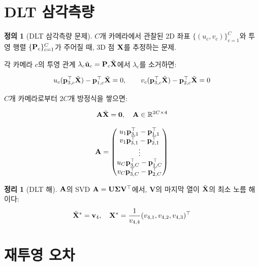 \documentclass[11pt, a4paper]{report}
\theoremstyle{definition}
\newtheorem{definition}{정의}[chapter]
\newtheorem{theorem}{정리}[chapter]
\theoremstyle{remark}
\begin{document}
\section{DLT 삼각측량}

\begin{definition}[DLT 삼각측량 문제]
$C$개 카메라에서 관찰된 2D 좌표 $\{(u_c, v_c)\}_{c=1}^{C}$와
투영 행렬 $\{\mathbf{P}_c\}_{c=1}^{C}$가 주어질 때,
3D 점 $\mathbf{X}$를 추정하는 문제.
\end{definition}

각 카메라 $c$의 투영 관계 $\lambda_c \tilde{\mathbf{u}}_c = \mathbf{P}_c \tilde{\mathbf{X}}$에서
$\lambda_c$를 소거하면:

\begin{equation}
u_c (\mathbf{p}_{3,c}^\top \tilde{\mathbf{X}}) - \mathbf{p}_{1,c}^\top \tilde{\mathbf{X}} = 0, \qquad
v_c (\mathbf{p}_{3,c}^\top \tilde{\mathbf{X}}) - \mathbf{p}_{2,c}^\top \tilde{\mathbf{X}} = 0
\end{equation}

$C$개 카메라로부터 $2C$개 방정식을 쌓으면:

\begin{equation}
\mathbf{A} \tilde{\mathbf{X}} = \mathbf{0}, \quad
\mathbf{A} \in \mathbb{R}^{2C \times 4}
\label{eq:dlt}
\end{equation}

\begin{equation}
\mathbf{A} = \begin{pmatrix}
u_1 \mathbf{p}_{3,1}^\top - \mathbf{p}_{1,1}^\top \\
v_1 \mathbf{p}_{3,1}^\top - \mathbf{p}_{2,1}^\top \\
\vdots \\
u_C \mathbf{p}_{3,C}^\top - \mathbf{p}_{1,C}^\top \\
v_C \mathbf{p}_{3,C}^\top - \mathbf{p}_{2,C}^\top
\end{pmatrix}
\end{equation}

\begin{theorem}[DLT 해]
$\mathbf{A}$의 SVD $\mathbf{A} = \mathbf{U} \bm{\Sigma} \mathbf{V}^\top$에서,
$\mathbf{V}$의 마지막 열이 $\tilde{\mathbf{X}}$의 최소 노름 해이다:
\begin{equation}
\tilde{\mathbf{X}}^* = \mathbf{v}_4, \quad \mathbf{X}^* = \frac{1}{v_{4,4}} (v_{4,1}, v_{4,2}, v_{4,3})^\top
\end{equation}
\end{theorem}


\section{재투영 오차}
\end{document}
